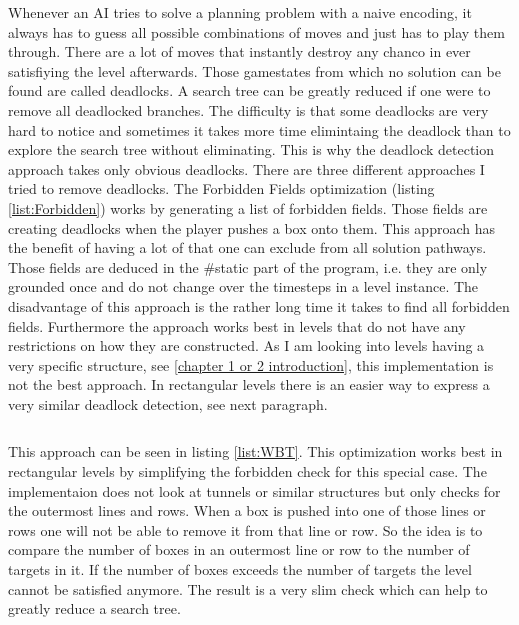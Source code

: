 \documentclass{report}
\begin{document}
Whenever an AI tries to solve a planning problem with a naive encoding, it always has to guess all possible combinations of moves and just has to play them through. There are a lot of moves that instantly destroy any chanco in ever satisfiying the level afterwards. Those gamestates from which no solution can be found are called deadlocks. A search tree can be greatly reduced if one were to remove all deadlocked branches. The difficulty is that some deadlocks are very hard to notice and sometimes it takes more time elimintaing the deadlock than to explore the search tree without eliminating. This is why the deadlock detection approach takes only obvious deadlocks. There are three different approaches I tried to remove deadlocks. The Forbidden Fields optimization (listing \ref{list:Forbidden}) works by generating a list of forbidden fields. Those fields are creating deadlocks when the player pushes a box onto them. This approach has the benefit of having a lot of that one can exclude from all solution pathways. Those fields are deduced in the \#static part of the program, i.e. they are only grounded once and do not change over the timesteps in a level instance.
The disadvantage of this approach is the rather long time it takes to find all forbidden fields. Furthermore the approach works best in levels that do not have any restrictions on how they are constructed. As I am looking into levels having a very specific structure, see \ref{chapter 1 or 2 introduction}, this implementation is not the best approach. In rectangular levels there is an easier way to express a very similar deadlock detection, see next paragraph.


\begin{lstlisting}[caption={Deadlock check},label=list:WBT]
\end{lstlisting}

This approach can be seen in listing \ref{list:WBT}. This optimization works best in rectangular levels by simplifying the forbidden check for this special case. The implementaion does not look at tunnels or similar structures but only checks for the outermost lines and rows. When a box is pushed into one of those lines or rows one will not be able to remove it from that line or row. So the idea is to compare the number of boxes in an outermost line or row to the number of targets in it. If the number of boxes exceeds the number of targets the level cannot be satisfied anymore. The result is a very slim check which can help to greatly reduce a search tree.
\end{document}
